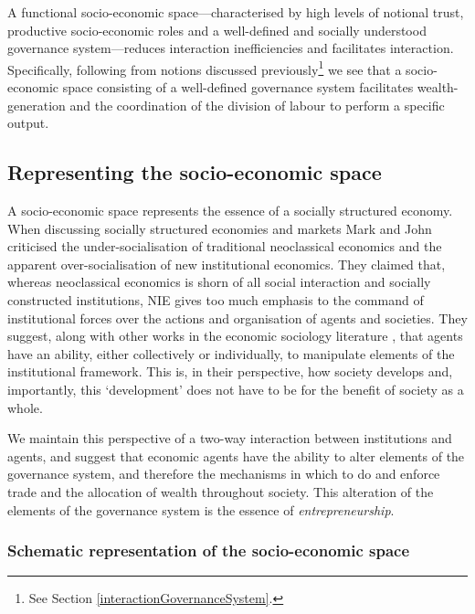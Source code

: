 A functional socio-economic space---characterised by high levels of notional trust, productive socio-economic roles and a well-defined and socially understood governance system---reduces interaction inefficiencies and facilitates interaction. Specifically, following from notions discussed previously\footnote{See Section \ref{interactionGovernanceSystem}. } we see that a socio-economic space consisting of a well-defined governance system facilitates wealth-generation and the coordination of the division of labour to perform a specific output.

\subsection{Representing the socio-economic space}

A socio-economic space represents the essence of a socially structured economy. When discussing socially structured economies and markets Mark \citet{Granovetter1985, Granovetter2005} and John \citet{Lie1997} criticised the under-socialisation of traditional neoclassical economics and the apparent over-socialisation of new institutional economics. They claimed that, whereas neoclassical economics is shorn of all social interaction and socially constructed institutions, NIE gives too much emphasis to the command of institutional forces over the actions and organisation of agents and societies. They suggest, along with other works in the economic sociology literature \citep{DiMaggio1988, Swedberg2000, Battilana2006}, that agents have an ability, either collectively or individually, to manipulate elements of the institutional framework. This is, in their perspective, how society develops and, importantly, this `development' does not have to be for the benefit of society as a whole.

We maintain this perspective of a two-way interaction between institutions and agents, and suggest that economic agents have the ability to alter elements of the governance system, and therefore the mechanisms in which to do and enforce trade and the allocation of wealth throughout society. This alteration of the elements of the governance system is the essence of \emph{entrepreneurship}.

\subsubsection{Schematic representation of the socio-economic space} \label{subsubsec:schematicRepresentation}

